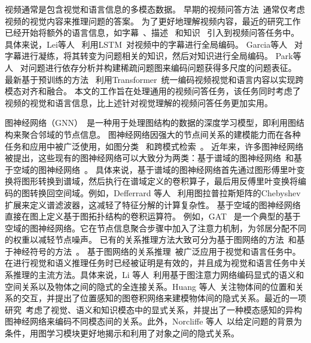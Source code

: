 
视频通常是包含视觉和语言信息的多模态数据。
早期的视频问答方法~\cite{xu2017video,jiang2020divide,gao2018motion,zha2019spatiotemporal}通常仅考虑视频的视觉内容来推理问题的答案。 
为了更好地理解视频内容，最近的研究工作已经开始将额外的语言信息，如字幕~\cite{lei2018tvqa,lei2020tvqa}、描述~\cite{kim2018multimodal,kim2020dense} 和知识~\cite{garcia2020knowit,garcia2020knowledge} 引入到视频问答任务中。
具体来说，Lei等人~\cite{lei2018tvqa,lei2020tvqa} 利用LSTM~\cite{hochreiter1997long}对视频中的字幕进行全局编码。
Garcia等人~\cite{garcia2020knowit,garcia2020knowledge} 对字幕进行凝练，将其转变为问题相关的知识，然后对知识进行全局编码。
Park等人~\cite{park2021bridge} 对问题进行依存分析并构建稀疏问题图来编码问题获得多尺度的问题表征。
最新基于预训练的方法~\cite{amrani2021noise,lei2021less,seo2021look,yang2021just} 利用Transformer~\cite{vaswani2017attention}统一编码视频视觉和语言内容以实现跨模态对齐和融合。
本文的工作旨在处理通用的视频问答任务，该任务同时考虑了视频的视觉和语言信息，比上述针对视觉理解的视频问答任务更加实用。


图神经网络（GNN）~\cite{scarselli2008graph}是一种用于处理图结构的数据的深度学习模型，即利用图结构来聚合邻域的节点信息。 
图神经网络因强大的节点间关系的建模能力而在各种任务和应用中被广泛使用，如图分类~\cite{zhang2018end,bai2020learning} 和跨模式检索~\cite{wang2020learning,song2021spatial}。
近年来，许多图神经网络被提出，这些现有的图神经网络可以大致分为两类：基于谱域的图神经网络~\cite{bruna2013spectral,henaff2015deep,rippel2015spectral,defferrard2016convolutional}和基于空域的图神经网络~\cite{kipf2016semi,velivckovic2017graph,hamilton2017inductive}。
具体来说，基于谱域的图神经网络首先通过图形傅里叶变换将图形转换到谱域，然后执行在谱域定义的卷积算子，最后用反傅里叶变换将编码的图转换回空间域。例如，Defferrard 等人~\cite{defferrard2016convolutional} 利用图拉普拉斯矩阵的Chebyshev扩展来定义谱滤波器，这减轻了特征分解的计算复杂性。
基于空域的图神经网络直接在图上定义基于图拓扑结构的卷积运算符。
例如，GAT~\cite{velivckovic2017graph} 是一个典型的基于空域的图神经网络。它在节点信息聚合步骤中加入了注意力机制，为邻居分配不同的权重以减轻节点噪声。
已有的关系推理方法大致可分为基于图网络的方法~\cite{li2019relation,chen2019graph,gao2020multi}和基于神经符号的方法~\cite{garcez2019neural,vedantam2019probabilistic,amizadeh2020neuro}。
基于图网络的关系推理~\cite{yao2018exploring,cadene2019murel,li2019visual,yang2020prior,pei2020visual,chen2020figure}被广泛应用于视觉和语言任务中。在进行视觉和语义推理任务时已经被证明是有效的，并且成为视觉和语言任务中关系推理的主流方法。具体来说，Li 等人~\cite{li2019relation}利用基于图注意力网络编码显式的语义和空间关系以及物体之间的隐式的全连接关系。Huang 等人~\cite{huang2020location}关注物体间的位置和关系的交互，并提出了位置感知的图卷积网络来建模物体间的隐式关系。最近的一项研究~\cite{zhu2020mucko}考虑了视觉、语义和知识模态中的显式关系，并提出了一种模态感知的异构图神经网络来编码不同模态间的关系。此外，Norcliffe 等人~\cite{norcliffe2018learning}以给定问题的背景为条件，用图学习模块更好地揭示和利用了对象之间的隐式关系。


